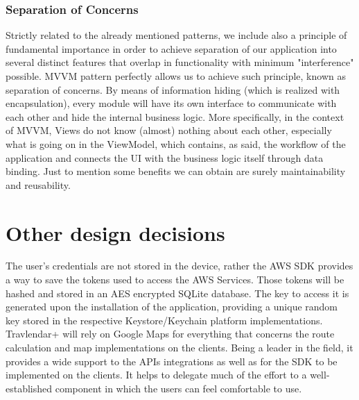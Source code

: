 \subsubsection*{Separation of Concerns}
Strictly related to the already mentioned patterns, we include also a principle of fundamental importance in order to achieve separation of our application into several distinct features that overlap in functionality with minimum "interference" possible. MVVM pattern perfectly allows us to achieve such principle, known as separation of concerns. By means of information hiding (which is realized with encapsulation), every module will have its own interface to communicate with each other and hide the internal business logic. More specifically, in the context of MVVM, Views do not know (almost) nothing about each other, especially what is going on in the ViewModel, which contains, as said, the workflow of the application and connects the UI with the business logic itself through data binding. Just to mention some benefits we can obtain are surely maintainability and reusability.

\section{Other design decisions}
\label{sec:des_dec}
The user's credentials are not stored in the device, rather the AWS SDK provides a way to save the tokens used to access the AWS Services. Those tokens will be hashed and stored in an AES encrypted SQLite database. The key to access it is generated upon the installation of the application, providing a unique random key stored in the respective Keystore/Keychain platform implementations. Travlendar+ will rely on Google Maps for everything that concerns the route calculation and map implementations on the clients. Being a leader in the field, it provides a wide support to the APIs integrations as well as for the SDK to be implemented on the clients.
It helps to delegate much of the effort to a well-established component in which the users can feel comfortable to use.